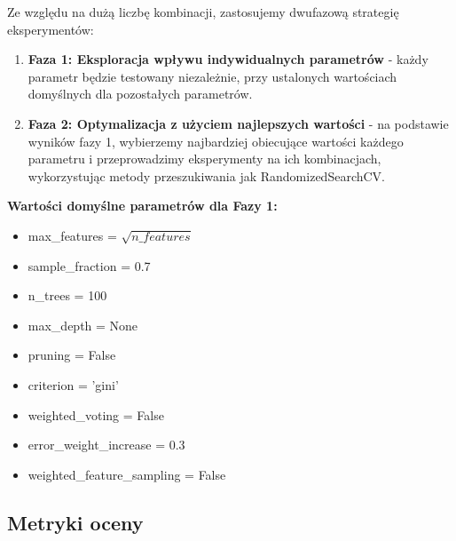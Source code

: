 \documentclass[11pt,a4paper]{article}
\begin{document}
Ze względu na dużą liczbę kombinacji, zastosujemy dwufazową strategię eksperymentów:

\begin{enumerate}
    \item \textbf{Faza 1: Eksploracja wpływu indywidualnych parametrów} - każdy parametr będzie testowany niezależnie, przy ustalonych wartościach domyślnych dla pozostałych parametrów.

    \item \textbf{Faza 2: Optymalizacja z użyciem najlepszych wartości} - na podstawie wyników fazy 1, wybierzemy najbardziej obiecujące wartości każdego parametru i przeprowadzimy eksperymenty na ich kombinacjach, wykorzystując metody przeszukiwania jak RandomizedSearchCV.
\end{enumerate}

\textbf{Wartości domyślne parametrów dla Fazy 1:}
\begin{itemize}
    \item max\_features = $\sqrt{n\_features}$
    \item sample\_fraction = 0.7
    \item n\_trees = 100
    \item max\_depth = None
    \item pruning = False
    \item criterion = 'gini'
    \item weighted\_voting = False
    \item error\_weight\_increase = 0.3
    \item weighted\_feature\_sampling = False
\end{itemize}



\subsection{Metryki oceny}
\end{document}
